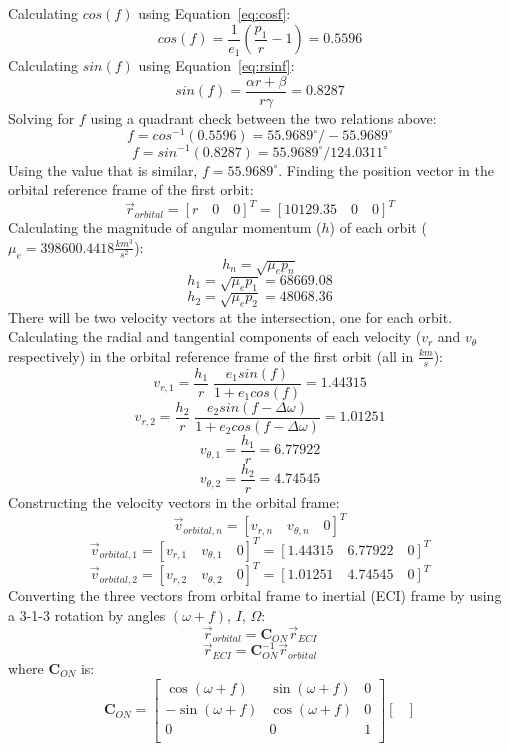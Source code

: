 \documentclass[12pt, letterpaper]{aiaa-tc}
\begin{document}
\begin{enumerate}
    Calculating $cos(f)$ using Equation~\eqref{eq:cosf}:
    \[ cos(f)=\frac{1}{e_1}\left (\frac{p_1}{r}-1 \right)=0.5596 \]
    Calculating $sin(f)$ using Equation~\eqref{eq:rsinf}:
    \[ sin(f)=\frac{\alpha r+\beta}{r\gamma}=0.8287 \]
    Solving for $f$ using a quadrant check between the two relations above:
    \[ f=cos^{-1}(0.5596)=55.9689^{\circ}/-55.9689^{\circ} \]
    \[ f=sin^{-1}(0.8287)=55.9689^{\circ}/124.0311^{\circ} \]
    Using the value that is similar, $f=55.9689^{\circ}$.
    Finding the position vector in the orbital reference frame of the first orbit:
    \[ \vec{r}_{orbital}=[r\quad 0\quad 0]^T=[10129.35\quad 0\quad 0]^T \]
    Calculating the magnitude of angular momentum ($h$) of each orbit ($\mu_e=398600.4418\frac{km^3}{s^2}$):
    \[ h_n=\sqrt{\mu_{e} p_n} \]
    \[ h_1=\sqrt{\mu_{e} p_1}=68669.08 \]
    \[ h_2=\sqrt{\mu_{e} p_2}=48068.36 \]
    There will be two velocity vectors at the intersection, one for each orbit. Calculating 
    the radial and tangential components of each velocity ($v_{r}$ and $v_{\theta}$ respectively) in the orbital 
    reference frame of the first orbit (all in $\frac{km}{s}$):
    \[ v_{r,1}=\frac{h_1}{r}\;\frac{e_1sin(f)}{1+e_1cos(f)}=1.44315 \]
    \[ v_{r,2}=\frac{h_2}{r}\;\frac{e_2sin(f-\Delta\omega)}{1+e_2cos(f-\Delta\omega)}=1.01251 \]
    \[ v_{\theta,1}=\frac{h_1}{r}=6.77922 \]
    \[ v_{\theta,2}=\frac{h_2}{r}=4.74545 \]
    Constructing the velocity vectors in the orbital frame:
    \[ \vec{v}_{orbital,n}=[v_{r,n}\quad v_{\theta,n}\quad 0]^T \]
    \[ \vec{v}_{orbital,1}=[v_{r,1}\quad v_{\theta,1}\quad 0]^T=[1.44315\quad 6.77922\quad 0]^T \]
    \[ \vec{v}_{orbital,2}=[v_{r,2}\quad v_{\theta,2}\quad 0]^T=[1.01251\quad 4.74545\quad 0]^T \]
    Converting the three vectors from orbital frame to inertial (ECI) frame by using 
    a 3-1-3 rotation by angles $(\omega+f)$, $I$, $\Omega$:
    \[ \vec{r}_{orbital}=\bm{C}_{ON}\vec{r}_{ECI} \]
    \begin{equation}
        \vec{r}_{ECI}=\bm{C}^{-1}_{ON}\vec{r}_{orbital}
        \label{eq:DCMtransform}
    \end{equation}
    where $\bm{C}_{ON}$ is:
    \[ \bm{C}_{ON}=
    \begin{bmatrix}
        \cos(\omega+f) & \sin(\omega+f) & 0 \\
        -\sin(\omega+f) & \cos(\omega+f) & 0 \\
        0 & 0 & 1 \\
    \end{bmatrix}
    \begin{bmatrix}

\end{bmatrix}\]
\end{enumerate}
\end{document}
